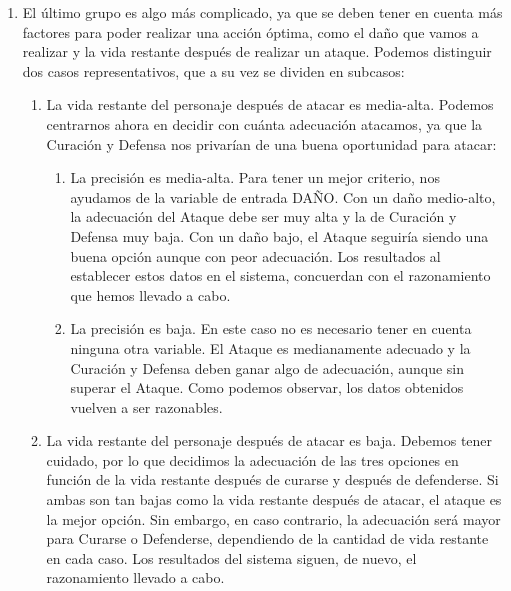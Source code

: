 \begin{enumerate}
\item El último grupo es algo más complicado, ya que se deben tener en cuenta más factores para poder realizar una acción óptima, como el daño que vamos a realizar y la vida restante después de realizar un ataque. Podemos distinguir dos casos representativos, que a su vez se dividen en subcasos:
\begin{enumerate}[label={3.\arabic*.}]
	\item La vida restante del personaje después de atacar es media-alta. Podemos centrarnos ahora en decidir con cuánta adecuación atacamos, ya que la Curación y Defensa nos privarían de una buena oportunidad para atacar:
	\begin{enumerate}[label=\alph*)]
		\item La precisión es media-alta. Para tener un mejor criterio, nos ayudamos de la variable de entrada DAÑO. Con un daño medio-alto, la adecuación del Ataque debe ser muy alta y la de Curación y Defensa muy baja. Con un daño bajo, el Ataque seguiría siendo una buena opción aunque con peor adecuación. Los resultados al establecer estos datos en el sistema, concuerdan con el razonamiento que hemos llevado a cabo.
		\item La precisión es baja. En este caso no es necesario tener en cuenta ninguna otra variable. El Ataque es medianamente adecuado y la Curación y Defensa deben ganar algo de adecuación, aunque sin superar el Ataque. Como podemos observar, los datos obtenidos vuelven a ser razonables.
	\end{enumerate}
	\item La vida restante del personaje después de atacar es baja. Debemos tener cuidado, por lo que decidimos la adecuación de las tres opciones en función de la vida restante después de curarse y después de defenderse. Si ambas son tan bajas como la vida restante después de atacar, el ataque es la mejor opción. Sin embargo, en caso contrario, la adecuación será mayor para Curarse o Defenderse, dependiendo de la cantidad de vida restante en cada caso. Los resultados del sistema siguen, de nuevo, el razonamiento llevado a cabo.
\end{enumerate}
\end{enumerate}